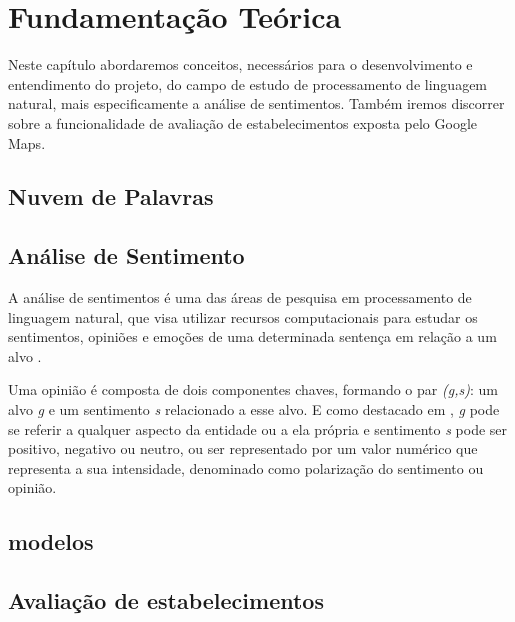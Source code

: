 \chapter{Fundamentação Teórica}
\label{cap:fund_teorica}

Neste capítulo abordaremos conceitos, necessários para o desenvolvimento e entendimento do projeto, do campo de estudo de processamento de linguagem natural, mais especificamente a análise de sentimentos. Também iremos discorrer sobre a funcionalidade de avaliação de estabelecimentos exposta pelo Google Maps.

\section{Nuvem de Palavras}
\label{cap:fund_teorica:sec:word_cloud}

\section{Análise de Sentimento}
\label{cap:fund_teorica:sec:analise_sentimento}
A análise de sentimentos é uma das áreas de pesquisa em processamento de linguagem natural, que visa utilizar recursos computacionais para estudar os sentimentos, opiniões e emoções de uma determinada sentença em relação a um alvo \cite{Bellini2019}.

Uma opinião é composta de dois componentes chaves, formando o par \emph{(g,s)}: um alvo \emph{g} e um sentimento \emph{s} relacionado a esse alvo. E como destacado em \cite{Machado2018}, \emph{g} pode se referir a qualquer aspecto da entidade ou a ela própria e sentimento \emph{s} pode ser positivo, negativo ou neutro, ou ser representado por um valor numérico que representa a sua intensidade, denominado como polarização do sentimento ou opinião.



\section{modelos}
\label{cap:fund_teorica:sec:modelos}

\section{Avaliação de estabelecimentos}
\label{cap:fund_teorica:sec:avaliacao_estabelecimentos}
